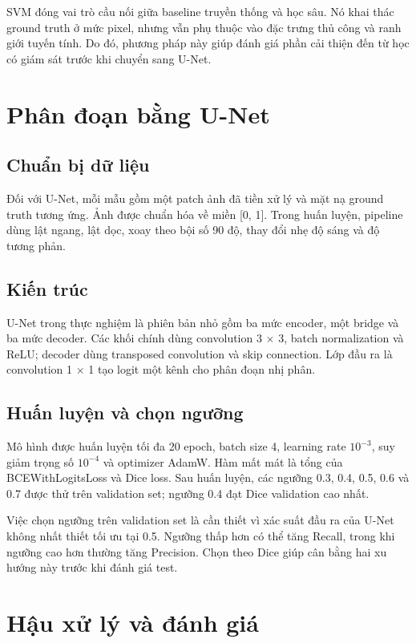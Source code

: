 \documentclass[12pt,a4paper]{report}
\begin{document}
SVM đóng vai trò cầu nối giữa baseline truyền thống và học sâu. Nó khai thác ground truth ở mức pixel, nhưng vẫn phụ thuộc vào đặc trưng thủ công và ranh giới tuyến tính. Do đó, phương pháp này giúp đánh giá phần cải thiện đến từ học có giám sát trước khi chuyển sang U-Net.

\section{Phân đoạn bằng U-Net}

\subsection{Chuẩn bị dữ liệu}

Đối với U-Net, mỗi mẫu gồm một patch ảnh đã tiền xử lý và mặt nạ ground truth tương ứng. Ảnh được chuẩn hóa về miền [0, 1]. Trong huấn luyện, pipeline dùng lật ngang, lật dọc, xoay theo bội số 90 độ, thay đổi nhẹ độ sáng và độ tương phản.

\subsection{Kiến trúc}

U-Net trong thực nghiệm là phiên bản nhỏ gồm ba mức encoder, một bridge và ba mức decoder. Các khối chính dùng convolution 3 $\times$ 3, batch normalization và ReLU; decoder dùng transposed convolution và skip connection. Lớp đầu ra là convolution 1 $\times$ 1 tạo logit một kênh cho phân đoạn nhị phân.

\subsection{Huấn luyện và chọn ngưỡng}

Mô hình được huấn luyện tối đa 20 epoch, batch size 4, learning rate $10^{-3}$, suy giảm trọng số $10^{-4}$ và optimizer AdamW. Hàm mất mát là tổng của BCEWithLogitsLoss và Dice loss. Sau huấn luyện, các ngưỡng 0.3, 0.4, 0.5, 0.6 và 0.7 được thử trên validation set; ngưỡng 0.4 đạt Dice validation cao nhất.

Việc chọn ngưỡng trên validation set là cần thiết vì xác suất đầu ra của U-Net không nhất thiết tối ưu tại 0.5. Ngưỡng thấp hơn có thể tăng Recall, trong khi ngưỡng cao hơn thường tăng Precision. Chọn theo Dice giúp cân bằng hai xu hướng này trước khi đánh giá test.

\section{Hậu xử lý và đánh giá}
\end{document}

